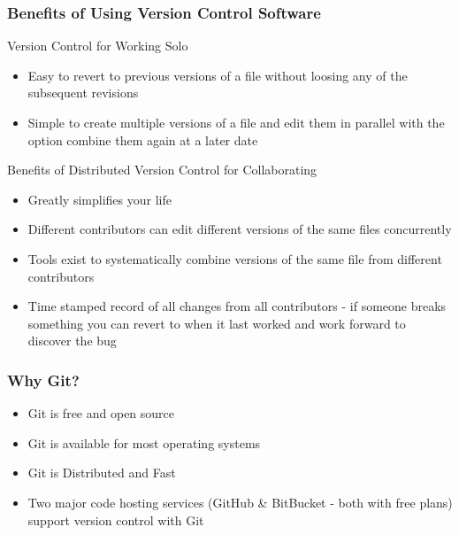 \documentclass[xcolor=dvipsnames]{beamer}
\begin{document}
\begin{frame}
\frametitle{Benefits of Using Version Control Software}
\begin{block}{Version Control for Working Solo}
\begin{itemize}
\item Easy to revert to previous versions of a file without loosing any of the subsequent revisions
\item Simple to create multiple versions of a file and edit them in parallel with the option combine them again at a later date
\end{itemize}
\end{block}

\begin{block}{Benefits of Distributed Version Control for Collaborating}
\begin{itemize}
\item Greatly simplifies your life
\item Different contributors can edit different versions of the same files concurrently 
\item Tools exist to systematically combine versions of the same file from different contributors
\item Time stamped record of all changes from all contributors - if someone breaks something you can revert to when it last worked and work forward to discover the bug 
\end{itemize}
\end{block}

\end{frame}

\begin{frame}
\frametitle{Why Git?}
\begin{itemize}
\item Git is free and open source
\newline
\newline
\item Git is available for most operating systems
\newline
\newline
\item Git is Distributed and Fast
\newline
\newline
\item Two major code hosting services (GitHub \& BitBucket - both with free plans) support version control with Git
\end{itemize}
\end{frame}
\end{document}
